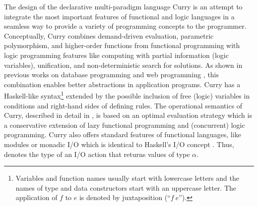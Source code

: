 \documentclass{tlp}
\begin{document}
The design of the declarative multi-paradigm language Curry
is an attempt to integrate the most important features
of functional and logic languages in a seamless way
to provide a variety of programming concepts to the programmer.
Conceptually, Curry combines demand-driven evaluation,
parametric polymorphism, and
higher-order functions from functional programming
with logic programming features like
computing with partial information (logic variables),
unification, and non-deterministic search for solutions.
As shown in previous works on database programming
\cite{BrasselHanusMueller08PADL,Fischer05}
and web programming \cite{Hanus01PADL,Hanus06PPDP,Hanus07PPDP},
this combination enables better abstractions in application programs.
Curry has a Haskell-like syntax\footnote{Variables and function names usually
start with lowercase letters and the names of type and data constructors
start with an uppercase letter. The application of $f$
to $e$ is denoted by juxtaposition (``$f~e$'').}
\cite{PeytonJones03Haskell}
extended by the possible inclusion of free (logic)
variables in conditions and right-hand sides of defining rules.
The operational semantics of Curry, described in detail in
\cite{Hanus97POPL,Hanus12Curry}, is based on an optimal evaluation strategy
\cite{AntoyEchahedHanus00JACM} which is a conservative extension
of lazy functional programming and (concurrent) logic programming.
Curry also offers standard features of
functional languages, like modules or monadic I/O
which is identical to Haskell's I/O concept \cite{Wadler97}.
Thus,  denotes the type of an I/O action that returns values
of type $\alpha$.
\end{document}
